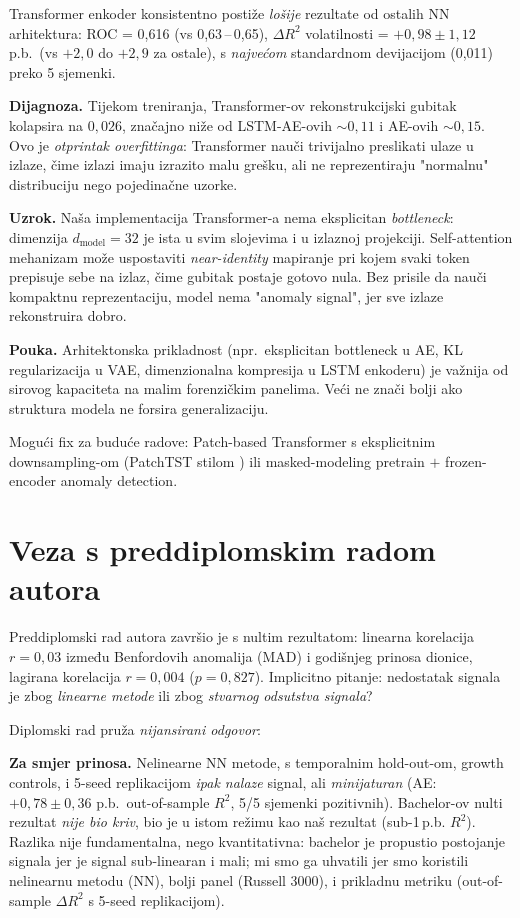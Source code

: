 \documentclass[diplomskirad,authoryear]{fer}
\begin{document}
Transformer enkoder konsistentno postiže \emph{lošije} rezultate od ostalih NN arhitektura: ROC = 0,616 (vs 0,63\,--\,0,65), $\Delta R^2$ volatilnosti = $+0{,}98 \pm 1{,}12$ p.b.\ (vs $+2{,}0$ do $+2{,}9$ za ostale), s \emph{najvećom} standardnom devijacijom (0,011) preko 5 sjemenki.

\textbf{Dijagnoza.} Tijekom treniranja, Transformer-ov rekonstrukcijski gubitak kolapsira na $0{,}026$, značajno niže od LSTM-AE-ovih $\sim 0{,}11$ i AE-ovih $\sim 0{,}15$. Ovo je \emph{otprintak overfittinga}: Transformer nauči trivijalno preslikati ulaze u izlaze, čime izlazi imaju izrazito malu grešku, ali ne reprezentiraju "normalnu" distribuciju nego pojedinačne uzorke.

\textbf{Uzrok.} Naša implementacija Transformer-a nema eksplicitan \emph{bottleneck}: dimenzija $d_{\text{model}} = 32$ je ista u svim slojevima i u izlaznoj projekciji. Self-attention mehanizam može uspostaviti \emph{near-identity} mapiranje pri kojem svaki token prepisuje sebe na izlaz, čime gubitak postaje gotovo nula. Bez prisile da nauči kompaktnu reprezentaciju, model nema "anomaly signal", jer sve izlaze rekonstruira dobro.

\textbf{Pouka.} Arhitektonska prikladnost (npr.\ eksplicitan bottleneck u AE, KL regularizacija u VAE, dimenzionalna kompresija u LSTM enkoderu) je važnija od sirovog kapaciteta na malim forenzičkim panelima. Veći ne znači bolji ako struktura modela ne forsira generalizaciju.

Mogući fix za buduće radove: Patch-based Transformer s eksplicitnim downsampling-om (PatchTST stilom \citep{nie2023}) ili masked-modeling pretrain $+$ frozen-encoder anomaly detection.

\section{Veza s preddiplomskim radom autora}

Preddiplomski rad autora završio je s nultim rezultatom: linearna korelacija $r = 0{,}03$ između Benfordovih anomalija (MAD) i godišnjeg prinosa dionice, lagirana korelacija $r = 0{,}004$ ($p = 0{,}827$). Implicitno pitanje: nedostatak signala je zbog \emph{linearne metode} ili zbog \emph{stvarnog odsutstva signala}?

Diplomski rad pruža \emph{nijansirani odgovor}:

\textbf{Za smjer prinosa.} Nelinearne NN metode, s temporalnim hold-out-om, growth controls, i 5-seed replikacijom \emph{ipak nalaze} signal, ali \emph{minijaturan} (AE: $+0{,}78 \pm 0{,}36$ p.b.\ out-of-sample $R^2$, 5/5 sjemenki pozitivnih). Bachelor-ov nulti rezultat \emph{nije bio kriv}, bio je u istom režimu kao naš rezultat (sub-1\,p.b. $R^2$). Razlika nije fundamentalna, nego kvantitativna: bachelor je propustio postojanje signala jer je signal sub-linearan i mali; mi smo ga uhvatili jer smo koristili nelinearnu metodu (NN), bolji panel (Russell 3000), i prikladnu metriku (out-of-sample $\Delta R^2$ s 5-seed replikacijom).
\end{document}
